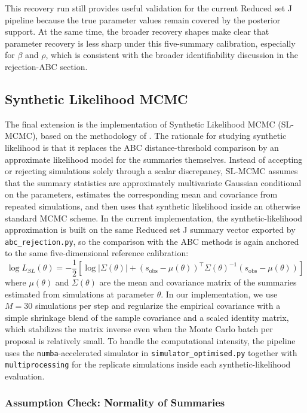 \documentclass[11pt]{article}
\begin{document}
This recovery run still provides useful validation for the current Reduced set J pipeline because the true parameter values remain covered by the posterior support. At the same time, the broader recovery shapes make clear that parameter recovery is less sharp under this five-summary calibration, especially for $\beta$ and $\rho$, which is consistent with the broader identifiability discussion in the rejection-ABC section.

\subsection{Synthetic Likelihood MCMC}

The final extension is the implementation of Synthetic Likelihood MCMC (SL-MCMC), based on the methodology of \citet{wood2010}. The rationale for studying synthetic likelihood is that it replaces the ABC distance-threshold comparison by an approximate likelihood model for the summaries themselves. Instead of accepting or rejecting simulations solely through a scalar discrepancy, SL-MCMC assumes that the summary statistics are approximately multivariate Gaussian conditional on the parameters, estimates the corresponding mean and covariance from repeated simulations, and then uses that synthetic likelihood inside an otherwise standard MCMC scheme. In the current implementation, the synthetic-likelihood approximation is built on the same Reduced set J summary vector exported by \texttt{abc\_rejection.py}, so the comparison with the ABC methods is again anchored to the same five-dimensional reference calibration:
\[
\log L_{SL}(\theta) = -\frac{1}{2} \left[ \log |\Sigma(\theta)| + (s_{\text{obs}} - \mu(\theta))^\top \Sigma(\theta)^{-1} (s_{\text{obs}} - \mu(\theta)) \right]
\]
where $\mu(\theta)$ and $\Sigma(\theta)$ are the mean and covariance matrix of the summaries estimated from simulations at parameter $\theta$. In our implementation, we use $M=30$ simulations per step and regularize the empirical covariance with a simple shrinkage blend of the sample covariance and a scaled identity matrix, which stabilizes the matrix inverse even when the Monte Carlo batch per proposal is relatively small. To handle the computational intensity, the pipeline uses the \texttt{numba}-accelerated simulator in \texttt{simulator\_optimised.py} together with \texttt{multiprocessing} for the replicate simulations inside each synthetic-likelihood evaluation.

\subsubsection{Assumption Check: Normality of Summaries}
\end{document}
